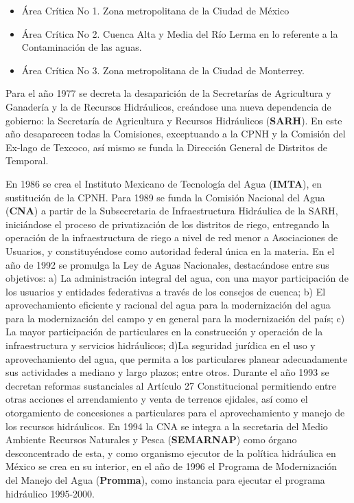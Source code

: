 \begin{itemize}
	\item Área Crítica No 1. Zona metropolitana de la Ciudad de México
	\item Área Crítica No 2. Cuenca Alta y Media del Río Lerma en lo referente a la Contaminación de las aguas.
	\item Área Crítica No 3. Zona metropolitana de la Ciudad de Monterrey.
\end{itemize}
Para el año 1977 se decreta la desaparición de la Secretarías de Agricultura y Ganadería y la de Recursos Hidráulicos, creándose una nueva dependencia de gobierno: la Secretaría de Agricultura y Recursos Hidráulicos (\textbf{SARH}). En este año desaparecen todas la Comisiones, exceptuando a la CPNH y la Comisión del Ex-lago de Texcoco, así mismo se funda la Dirección General de Distritos de Temporal.

En 1986 se crea el Instituto Mexicano de Tecnología del Agua (\textbf{IMTA}), en sustitución de la CPNH. Para 1989 se funda la Comisión Nacional del Agua (\textbf{CNA}) a partir de la Subsecretaria de Infraestructura Hidráulica de la SARH, iniciándose el proceso de privatización de los distritos de riego, entregando la operación de la infraestructura de riego a nivel de red menor a Asociaciones de Usuarios, y constituyéndose como autoridad federal única en la materia. En el año de 1992 se promulga la Ley de Aguas Nacionales, destacándose entre sus objetivos: a) La administración integral del agua, con una mayor participación de los usuarios y entidades federativas a través de los consejos de cuenca; b) El aprovechamiento eficiente y racional del agua para la modernización del agua para la modernización del campo y en general para la modernización del país; c) La mayor participación de particulares en la construcción y operación de la infraestructura y servicios hidráulicos; d)La seguridad jurídica en el uso y aprovechamiento del agua, que permita a los particulares planear adecuadamente sus actividades a mediano y largo plazos; entre otros. Durante el año 1993 se decretan reformas sustanciales al Artículo 27 Constitucional permitiendo entre otras acciones el arrendamiento y venta de terrenos ejidales, así como el otorgamiento de concesiones a particulares para el aprovechamiento y manejo de los recursos hidráulicos. En 1994 la CNA se integra a la secretaria del Medio Ambiente Recursos Naturales y Pesca (\textbf{SEMARNAP}) como órgano desconcentrado de esta, y como organismo ejecutor de la política hidráulica en México se crea en su interior, en el año de 1996 el Programa de Modernización del Manejo del Agua (\textbf{Promma}), como instancia para ejecutar el programa hidráulico 1995-2000.

